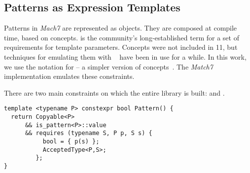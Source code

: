 
\subsection{Patterns as Expression Templates}
\label{sec:pat}

Patterns in \emph{Mach7} are represented as objects. They are composed
 at compile time, based on \Cpp{} concepts. 
 is the \Cpp{} community's long-established term for a set of 
requirements for template parameters. Concepts were not included in \Cpp{}11, 
but techniques for emulating them with 
~\cite{jarvi:03:cuj_arbitrary_overloading} have been in use for 
a while. In this work, we use the notation for  -- a 
simpler version of concepts~\cite{N3580}.
The \emph{Match7} implementation emulates these constraints.

There are two main constraints on which the entire library is built: 
 and .

\begin{lstlisting}
template <typename P> constexpr bool Pattern() {
  return Copyable<P>
      && is_pattern<P>::value
      && requires (typename S, P p, S s) {
           bool = { p(s) };
           AcceptedType<P,S>;
         };
}
\end{lstlisting}

